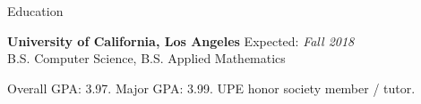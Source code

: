 \documentclass{resume} %
\begin{document}

\begin{rSection}{Education}

{\bf University of California, Los Angeles} \hfill {Expected: \em Fall 2018} \\ 
B.S. Computer Science, B.S. Applied Mathematics
\begin{rSubsection}{}{}{}{}
\item Overall GPA: 3.97. Major GPA: 3.99. UPE honor society member / tutor. 
\end{rSubsection}

\end{rSection}

\end{document}
